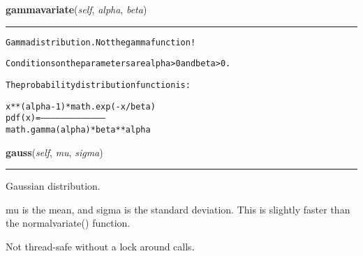     \label{random:Random:gammavariate}

    \vspace{0.5ex}

\hspace{.8\funcindent}\begin{boxedminipage}{\funcwidth}

    \raggedright \textbf{gammavariate}(\textit{self}, \textit{alpha}, \textit{beta})

    \vspace{-1.5ex}

    \rule{\textwidth}{0.5\fboxrule}
\setlength{\parskip}{2ex}
\begin{alltt}
Gamma distribution.  Not the gamma function!

Conditions on the parameters are alpha {\textgreater} 0 and beta {\textgreater} 0.

The probability distribution function is:

            x ** (alpha - 1) * math.exp(-x / beta)
  pdf(x) =  --------------------------------------
              math.gamma(alpha) * beta ** alpha
\end{alltt}

\setlength{\parskip}{1ex}
    \end{boxedminipage}

    \label{random:Random:gauss}

    \vspace{0.5ex}

\hspace{.8\funcindent}\begin{boxedminipage}{\funcwidth}

    \raggedright \textbf{gauss}(\textit{self}, \textit{mu}, \textit{sigma})

    \vspace{-1.5ex}

    \rule{\textwidth}{0.5\fboxrule}
\setlength{\parskip}{2ex}
    Gaussian distribution.

    mu is the mean, and sigma is the standard deviation.  This is slightly 
    faster than the normalvariate() function.

    Not thread-safe without a lock around calls.

\setlength{\parskip}{1ex}
    \end{boxedminipage}

    \vspace{0.5ex}

